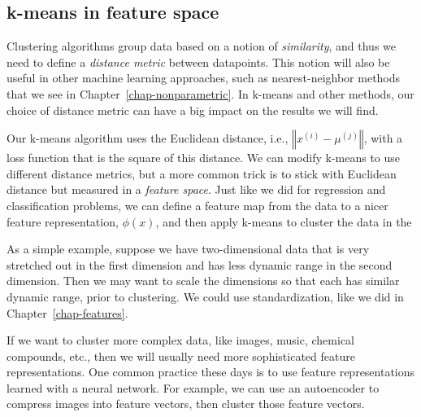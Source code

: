 


\subsection{k-means in feature space}

Clustering algorithms group data based on a notion of
\textit{similarity}, and thus we need to define a \textit{distance metric}
between datapoints. This notion
will also be useful in other machine learning approaches,
such as nearest-neighbor methods that we see in Chapter~\ref{chap-nonparametric}.
In k-means and other methods, our choice of distance
metric can have a big impact on the results we will find.

Our k-means algorithm uses the Euclidean distance, i.e., $\left\Vert
  x^{(i)} - \mu^{(j)} \right\Vert$, with a loss function that is the
square of this distance. We can modify k-means to use different
distance metrics, but a more common trick is to stick with Euclidean
distance but measured in a \textit{feature space}. Just like we did
for regression and classification problems, we can define a feature
map from the data to a nicer feature representation, $\phi(x)$, and
then apply k-means to cluster the data in the

As a simple example, suppose we have two-dimensional data that is very
stretched out in the first dimension and has less dynamic range in the
second dimension. Then we may want to scale the dimensions so that
each has similar dynamic range, prior to clustering. We could use
standardization, like we did in Chapter~\ref{chap-features}.

If we want to cluster more complex data, like images, music, chemical
compounds, etc., then we will usually need more sophisticated feature
representations. One common practice these days is to use feature
representations learned with a neural network. For example, we can use
an autoencoder to compress images into feature vectors, then cluster
those feature vectors.

